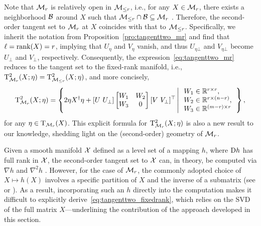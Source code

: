 Note that $\mathcal{M}_{r}$ is relatively open in $\mathcal{M}_{\le r}$, i.e., for any $X\in\mathcal{M}_{r}$, there exists a neighborhood $\mathcal{B}$ around $X$ such that $\mathcal{M}_{\le r}\cap\mathcal{B}\subseteq\mathcal{M}_{r}$ \cite{olikier2022continuity}. Therefore, the second-order tangent set to $\mathcal{M}_{r}$ at $X$ coincides with that to $\mathcal{M}_{\le r}$. Specifically, we inherit the notation from Proposition~\ref{pro:tangenttwo_mr} and find that $\ell=\operatorname{rank}(X)=r$, implying that $U_\eta$ and $V_\eta$ vanish, and thus $U_{\eta\bot}$ and $V_{\eta\bot}$ become $U_\bot$ and $V_\bot$, respectively. Consequently, the expression~\eqref{eq:tangenttwo_mr} reduces to the tangent set to the fixed-rank manifold, i.e., $\mathrm{T}^2_{\mathcal{M}_{r}}(X;\eta)=\mathrm{T}^2_{\mathcal{M}_{\le r}}(X;\eta)$, and more concisely,
\begin{equation}\label{eq:tangenttwo_fixedrank}
    \tangenttwo_{\fixedrank}(X;\eta)=\hkh{2\eta X^\dagger\eta + [U\ U_{\bot}]\left[ \begin{matrix}
        W_1&		W_2\\
        W_3&		0\\
    \end{matrix} \right][V\ V_{\bot}]^\top \left|\,\begin{array}{l}
    W_1\in\mbR^{r\times r},
    \\
    W_2\in\mbR^{r\times (n-r)},
    \\
    W_3\in\mbR^{(m-r)\times r}
    \end{array}\right.
    },
\end{equation}
for any $\eta\in\mathrm{T}_{\mathcal{M}_{r}}(X)$. This explicit formula for $\mathrm{T}^2_{\mathcal{M}_{r}}(X;\eta)$ is also a new result to our knowledge, shedding light on the (second-order) geometry of $\mathcal{M}_{r}$.

\begin{remark}
    Given a smooth manifold $\mathcal{X}$ defined as a level set of a mapping $h$, where $\mathrm{D} h$ has full rank in $\mathcal{X}$, the second-order tangent set to $\mathcal{X}$ can, in theory, be computed via $\nabla h$ and $\nabla^2 h$ \cite[Proposition 13.13]{rockafellar2009variationalanalysis}. However, for the case of $\mathcal{M}_{r}$, the commonly adopted choice of $X\mapsto h(X)$ involves a specific partition of $X$ and the inverse of a submatrix (see \cite[\S1.4]{guillemin1974differentialtopology} or \cite[\S7.5]{boumal2023introduction}). As a result, incorporating such an $h$ directly into the computation makes it difficult to explicitly derive~\eqref{eq:tangenttwo_fixedrank}, which relies on the SVD of the full matrix $X$---underlining the contribution of the approach developed in this section.
\end{remark}



